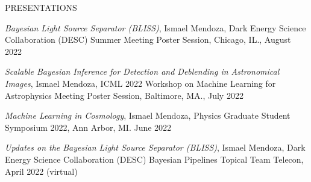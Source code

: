\begin{rSection}{PRESENTATIONS}
%
\vspace*{-1em}

\item \textit{Bayesian Light Source Separator (BLISS)}, Ismael Mendoza, Dark Energy Science Collaboration (DESC) Summer Meeting Poster Session, Chicago, IL., August 2022

\item \textit{Scalable Bayesian Inference for Detection and Deblending in Astronomical Images}, Ismael Mendoza, ICML 2022 Workshop on Machine Learning for Astrophysics Meeting Poster Session, Baltimore, MA., July 2022

\item \textit{Machine Learning in Cosmology}, Ismael Mendoza, Physics Graduate Student Symposium 2022, Ann Arbor, MI. June 2022

\item \textit{Updates on the Bayesian Light Source Separator (BLISS)}, Ismael Mendoza, Dark Energy Science Collaboration (DESC) Bayesian Pipelines Topical Team Telecon, April 2022 (virtual)






\end{rSection}
